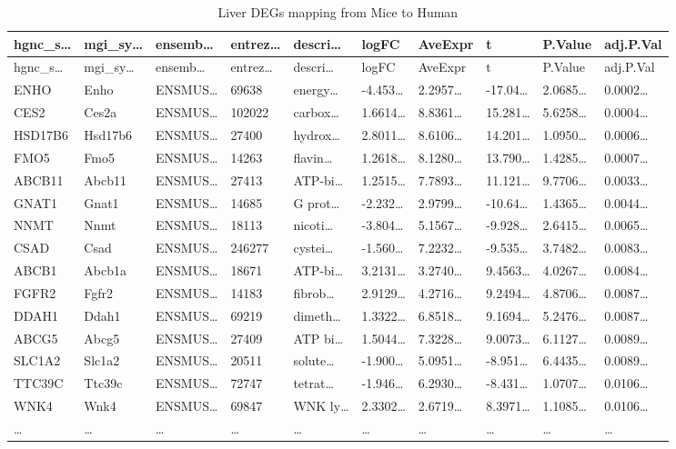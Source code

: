 \documentclass[
]{article}
\begin{document}
\begin{longtable}[]{@{}llllllllll@{}}
\caption{\label{tab:Liver-DEGs-mapping-from-Mice-to-Human}Liver DEGs mapping from Mice to Human}\tabularnewline
\toprule
hgnc\_s\ldots{} & mgi\_sy\ldots{} & ensemb\ldots{} & entrez\ldots{} & descri\ldots{} & logFC & AveExpr & t & P.Value & adj.P.Val\tabularnewline
\midrule
\endfirsthead
\toprule
hgnc\_s\ldots{} & mgi\_sy\ldots{} & ensemb\ldots{} & entrez\ldots{} & descri\ldots{} & logFC & AveExpr & t & P.Value & adj.P.Val\tabularnewline
\midrule
\endhead
ENHO & Enho & ENSMUS\ldots{} & 69638 & energy\ldots{} & -4.453\ldots{} & 2.2957\ldots{} & -17.04\ldots{} & 2.0685\ldots{} & 0.0002\ldots{}\tabularnewline
CES2 & Ces2a & ENSMUS\ldots{} & 102022 & carbox\ldots{} & 1.6614\ldots{} & 8.8361\ldots{} & 15.281\ldots{} & 5.6258\ldots{} & 0.0004\ldots{}\tabularnewline
HSD17B6 & Hsd17b6 & ENSMUS\ldots{} & 27400 & hydrox\ldots{} & 2.8011\ldots{} & 8.6106\ldots{} & 14.201\ldots{} & 1.0950\ldots{} & 0.0006\ldots{}\tabularnewline
FMO5 & Fmo5 & ENSMUS\ldots{} & 14263 & flavin\ldots{} & 1.2618\ldots{} & 8.1280\ldots{} & 13.790\ldots{} & 1.4285\ldots{} & 0.0007\ldots{}\tabularnewline
ABCB11 & Abcb11 & ENSMUS\ldots{} & 27413 & ATP-bi\ldots{} & 1.2515\ldots{} & 7.7893\ldots{} & 11.121\ldots{} & 9.7706\ldots{} & 0.0033\ldots{}\tabularnewline
GNAT1 & Gnat1 & ENSMUS\ldots{} & 14685 & G prot\ldots{} & -2.232\ldots{} & 2.9799\ldots{} & -10.64\ldots{} & 1.4365\ldots{} & 0.0044\ldots{}\tabularnewline
NNMT & Nnmt & ENSMUS\ldots{} & 18113 & nicoti\ldots{} & -3.804\ldots{} & 5.1567\ldots{} & -9.928\ldots{} & 2.6415\ldots{} & 0.0065\ldots{}\tabularnewline
CSAD & Csad & ENSMUS\ldots{} & 246277 & cystei\ldots{} & -1.560\ldots{} & 7.2232\ldots{} & -9.535\ldots{} & 3.7482\ldots{} & 0.0083\ldots{}\tabularnewline
ABCB1 & Abcb1a & ENSMUS\ldots{} & 18671 & ATP-bi\ldots{} & 3.2131\ldots{} & 3.2740\ldots{} & 9.4563\ldots{} & 4.0267\ldots{} & 0.0084\ldots{}\tabularnewline
FGFR2 & Fgfr2 & ENSMUS\ldots{} & 14183 & fibrob\ldots{} & 2.9129\ldots{} & 4.2716\ldots{} & 9.2494\ldots{} & 4.8706\ldots{} & 0.0087\ldots{}\tabularnewline
DDAH1 & Ddah1 & ENSMUS\ldots{} & 69219 & dimeth\ldots{} & 1.3322\ldots{} & 6.8518\ldots{} & 9.1694\ldots{} & 5.2476\ldots{} & 0.0087\ldots{}\tabularnewline
ABCG5 & Abcg5 & ENSMUS\ldots{} & 27409 & ATP bi\ldots{} & 1.5044\ldots{} & 7.3228\ldots{} & 9.0073\ldots{} & 6.1127\ldots{} & 0.0089\ldots{}\tabularnewline
SLC1A2 & Slc1a2 & ENSMUS\ldots{} & 20511 & solute\ldots{} & -1.900\ldots{} & 5.0951\ldots{} & -8.951\ldots{} & 6.4435\ldots{} & 0.0089\ldots{}\tabularnewline
TTC39C & Ttc39c & ENSMUS\ldots{} & 72747 & tetrat\ldots{} & -1.946\ldots{} & 6.2930\ldots{} & -8.431\ldots{} & 1.0707\ldots{} & 0.0106\ldots{}\tabularnewline
WNK4 & Wnk4 & ENSMUS\ldots{} & 69847 & WNK ly\ldots{} & 2.3302\ldots{} & 2.6719\ldots{} & 8.3971\ldots{} & 1.1085\ldots{} & 0.0106\ldots{}\tabularnewline
\ldots{} & \ldots{} & \ldots{} & \ldots{} & \ldots{} & \ldots{} & \ldots{} & \ldots{} & \ldots{} & \ldots{}\tabularnewline
\bottomrule
\end{longtable}
\end{document}

